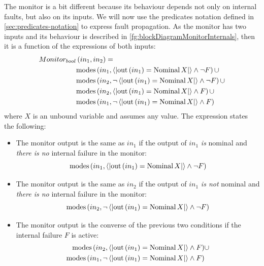 \documentclass[12pt,openright,twoside,a4paper,oldfontcommands,english,brazil,final]{abntex2}
\theoremstyle{theo}
\newcommand{\Nominal}[1]{\ensuremath\mathop{\mathrm{Nominal}} #1}
\newcommand{\predicate}[2]{\ensuremath\left\langle\left| \mathrm{out}\left(#1\right) = #2 \right|\right\rangle}
\newcommand{\modes}[2]{\ensuremath\mathrm{modes}\left(#1,#2\right)}
\begin{document}
The monitor is a bit different because its behaviour depends not only on internal faults, but also on its inputs. 
We will now use the predicates notation defined in \cref{sec:predicates-notation} to express fault propagation.
As the monitor has two inputs and its behaviour is described in \cref{fg:blockDiagramMonitorInternals}, then it is a function of the expressions of both inputs:
%
\begin{equation}
\label{eq:monitor-bool}
\begin{split}
Monitor_{bool} &\left(in_1, in_2\right) = \\
  & \modes{in_1}{\predicate{in_1}{\Nominal{X}} \land \lnot F} \cup\\
  & \modes{in_2}{\lnot \predicate{in_1}{\Nominal{X}} \land \lnot F} \cup\\
  & \modes{in_2}{\predicate{in_1}{\Nominal{X}} \land F} \cup\\
  & \modes{in_1}{\lnot \predicate{in_1}{\Nominal{X}} \land F}
\end{split}
\end{equation}
where $X$ is an unbound variable and assumes any value.
%
The expression states the following:
\begin{itemize}
  \item The monitor output is the same as $in_1$ if the output of $in_1$ \emph{is} nominal and \emph{there is no} internal failure in the monitor:
  \[
  \modes{in_1}{\predicate{in_1}{\Nominal{X}} \land \lnot F}
  \]
  \item The monitor output is the same as $in_2$ if the output of $in_1$ \emph{is not} nominal and \emph{there is no} internal failure in the monitor:
  \[
  \modes{in_2}{\lnot \predicate{in_1}{\Nominal{X}} \land \lnot F}
  \]
  \item The monitor output is the converse of the previous two conditions if the internal failure $F$ is active:
  \[
  \begin{split}
  \modes{in_2}{\predicate{in_1}{\Nominal{X}} \land F} &\cup\\
  \modes{in_1}{\lnot \predicate{in_1}{\Nominal{X}} \land F} &
  \end{split}
  \]
\end{itemize}
\end{document}
